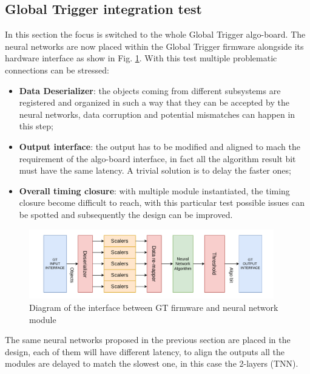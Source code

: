\documentclass[../../main.tex]{subfiles}
\begin{document}
\subsection{Global Trigger integration test}
\label{sec:P2GT_test_gt}
In this section the focus is switched to the whole Global Trigger algo-board. The neural networks are now placed within the Global Trigger firmware alongside its hardware interface as show in Fig. \ref{fig:GT-interface-diag}.  
With this test multiple problematic connections can be stressed:
\begin{itemize}
    \item \textbf{Data Deserializer}: the objects coming from different subsystems are registered and organized in such a way that they can be accepted by the neural networks, data corruption and potential mismatches can happen in this step;
    \item \textbf{Output interface}: the output has to be modified and aligned to mach the requirement of the algo-board interface, in fact all the algorithm result bit must have the same latency. A trivial solution is to delay the faster ones; 
    \item \textbf{Overall timing closure}: with multiple module instantiated, the timing closure become difficult to reach, with this particular test possible issues can be spotted and subsequently the design can be improved.
\end{itemize}
        
\begin{figure}[h]
    \centering
    \includegraphics[width=0.95\textwidth]{sections/05/Images/NN_GT-interface.pdf}
    \caption{Diagram of the interface between GT firmware and neural network module}
    \label{fig:GT-interface-diag}
\end{figure}

The same neural networks proposed in the previous section are placed in the design, each of them will have different latency, to align the outputs all the modules are delayed to match the slowest one, in this case the 2-layers (TNN).  
\end{document}
